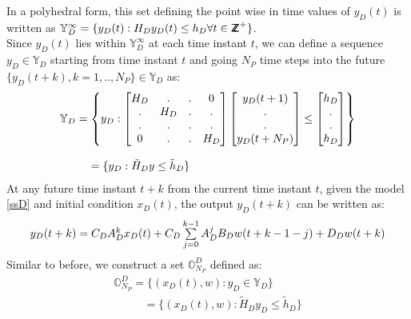 \documentclass[letterpaper, 10 pt, conference]{ieeeconf}  %
\newcommand*{\ZZ}{%
	\textsf{Z\kern-1ex Z}%
}
\begin{document}
In a polyhedral form, this set defining the point wise in time values of $y_D(t)$ is written as $\mathbb{Y}_D^{\infty} = \{y_D(t):H_Dy_D(t) \leq h_D \forall t \in \ZZ^+\}$. \\
 Since $y_D(t)$ lies within $\mathbb{Y}_D^{\infty}$ at each time instant $t$, we can define a sequence $y_D \in \mathbb{Y}_D$ starting from time instant $t$ and going $N_P$ time steps into the future $\{y_D(t+k),k=1,..,N_P\}\in\mathbb{Y}_D$ as:
 \begin{equation}
 \small
 \begin{matrix}
 \mathbb{Y}_D=\begin{Bmatrix}y_D:
 \begin{bmatrix}
 H_D & . & . & 0 \\
 . & H_D & . & .\\
 . & . & . & . \\
 0 & . & . & H_D
 \end{bmatrix}
 \begin{bmatrix}
 y_D(t+1) \\ . \\ . \\ y_D(t+N_P)
 \end{bmatrix}
 \leq \begin{bmatrix}
 h_D \\ . \\ . \\  h_D
 \end{bmatrix}
 \end{Bmatrix} 
 \\ \\
 \hspace{-120pt}
 = 
 \{ y_D: \tilde{H}_D y \leq \tilde{h}_D \}
 \end{matrix}
 \label{YD_set}
 \end{equation} 
At any future time instant $t+k$ from the current time instant $t$, given the model \eqref{ssD} and initial condition $x_D(t)$, the output $y_D(t+k)$ can be written as:
\begin{equation}
\small
\begin{matrix}
y_D(t+k)=C_DA_D^{k}x_D(t)+ C_D\sum\limits_{j=0}^{k-1}A_D^jB_Dw(t+k-1-j)+D_Dw(t+k) \\
\end{matrix}
\label{expanded_xD}
\end{equation}
Similar to before, we construct a set $\mathbb{O}^D_{N_P}$ defined as:
  \begin{equation}
  \begin{matrix}
  \mathbb{O}^D_{N_P} = \{(x_D(t),w):y_D\in \mathbb{Y}_D\}  \\
    \hspace{32pt} = \{(x_D(t),w):\tilde{H}_Dy_D \leq \tilde{h}_D\} 
  \end{matrix}
  \label{O_D_form}
  \end{equation}
\end{document}
